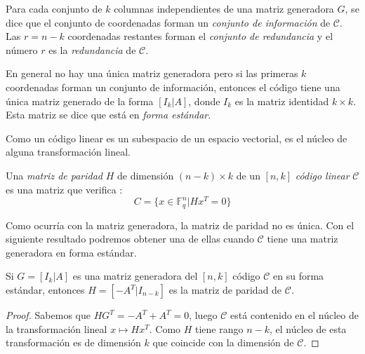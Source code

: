 Para cada conjunto de $k$ columnas independientes de una matriz generadora $G$, se dice que el conjunto de coordenadas forman un \emph{conjunto de información} de $\mathcal{C}$. Las $r = n - k$ coordenadas restantes forman el \emph{conjunto de redundancia} y el número $r$ es la \emph{redundancia} de $\mathcal{C}$.

En general no hay una única matriz generadora pero si las primeras $k$ coordenadas forman un conjunto de información, entonces el código tiene una única matriz generado de la forma $\left[I_k | A\right]$, donde $I_k$ es la matriz identidad $k \times k$. Esta matriz se dice que está en \emph{forma estándar}.

Como un código linear es un subespacio de un espacio vectorial, es el núcleo de alguna transformación lineal.

\begin{definition}
Una \emph{matriz de paridad} $H$ de dimensión $(n-k) \times k$ de un $\left[n,k\right]$ \emph{código linear} $\mathcal{C}$ es una matriz que verifica :
\[
C = \{ x \in  \mathbb{F}_q^n | Hx^T = 0  \}
\]
\end{definition}

Como ocurría con la matriz generadora, la matriz de paridad no es única. Con el siguiente resultado podremos obtener una de ellas cuando $\mathcal{C}$ tiene una matriz generadora en forma estándar.

\begin{theorem}

Si $G = \left[I_k | A\right]$ es una matriz generadora del $\left[n,k\right]$ código $\mathcal{C}$ en su forma estándar, entonces $H = \left[-A^T |I_{n-k}\right]$ es la matriz de paridad de $\mathcal{C}$.
\end{theorem}

\begin{proof}
Sabemos que $HG^T = -A^T + A^T = 0$, luego $\mathcal{C}$ está contenido en el núcleo de la transformación lineal $x \mapsto Hx^T$. Como $H$ tiene rango $n-k$, el núcleo de esta transformación es de dimensión $k$ que coincide con la dimensión de $\mathcal{C}$.
\end{proof}

